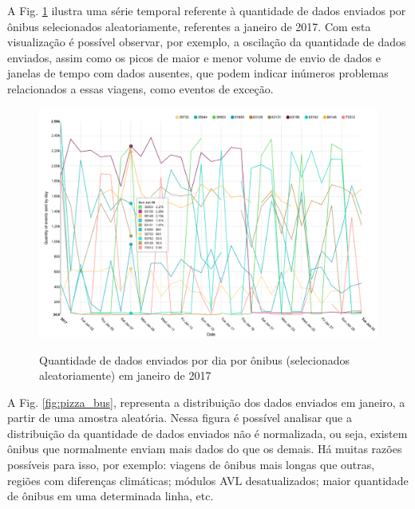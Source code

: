 \documentclass[
	12pt,				%
	oneside,			%
	a4paper,			%
	english,			%
	brazil				%
	]{abntex2ppgsi}
\begin{document}
A Fig. \ref {fig:analysis_by_bus_lines} ilustra uma série temporal referente à quantidade de dados enviados por ônibus selecionados aleatoriamente, referentes a janeiro de 2017. Com esta visualização é possível observar, por exemplo, a oscilação da quantidade de dados enviados, assim como os picos de maior e menor volume de envio de dados e janelas de tempo com dados ausentes, que podem indicar inúmeros problemas relacionados a essas viagens, como eventos de exceção.

\begin{figure}[!htb]%
	\centering
 	  \caption{Quantidade de dados enviados por dia  por ônibus (selecionados aleatoriamente) em janeiro de 2017}
		\includegraphics[width=1\linewidth]{images/analysis_by_bus_lines.png}
	\label{fig:analysis_by_bus_lines}
\end{figure}

A Fig. \ref{fig:pizza_bus}, representa a distribuição dos dados enviados em janeiro, a partir de uma amostra aleatória. Nessa figura é possível analisar que a distribuição da quantidade de dados enviados não é normalizada, ou seja, existem ônibus que normalmente enviam mais dados do que os demais. Há muitas razões possíveis para isso, por exemplo: viagens de ônibus mais longas que outras, regiões com diferenças climáticas; módulos AVL desatualizados; maior quantidade de ônibus em uma determinada linha, etc.
\end{document}
